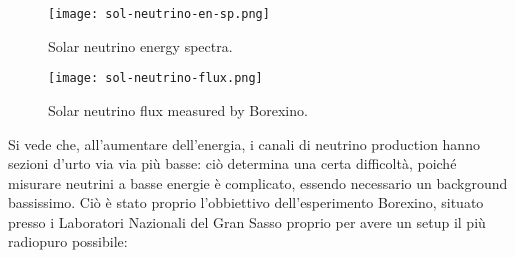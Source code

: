 \begin{figure}
	\centering
	\texttt{[image: sol-neutrino-en-sp.png]}
	\caption{Solar neutrino energy spectra.}
	\label{s-n-en-sp}
\end{figure}
\begin{figure}
	\centering
	\texttt{[image: sol-neutrino-flux.png]}
	\caption{Solar neutrino flux measured by Borexino.}
	\label{s-n-fl}
\end{figure}

Si vede che, all'aumentare dell'energia, i canali di neutrino production hanno sezioni d'urto via via più basse: ciò determina una certa difficoltà, poiché misurare neutrini a basse energie è complicato, essendo necessario un background bassissimo. Ciò è stato proprio l'obbiettivo dell'esperimento Borexino, situato presso i Laboratori Nazionali del Gran Sasso proprio per avere un setup il più radiopuro possibile: 










